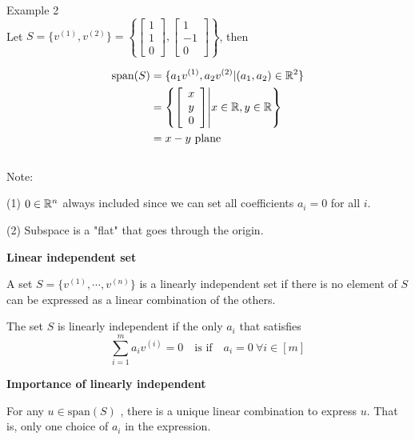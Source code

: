 Example 2\\
Let $S=\{v^{(1)}, v^{(2)}\}=\left\{\left[ 
\begin{array}{c} 
1\\
1\\
0
\end{array}
\right],           
\left[ 
\begin{array}{c} 
1\\
-1\\
0
\end{array}
\right]
\right\}$, then

\begin{align*}
\text{span}(S)&=\{a_{1}v^{(1)}, a_{2}v^{(2)}|(a_{1}, a_{2})\in \mathbb{R}^{2}\}\\
&=\left\{\left[ 
	\begin{array}{c} 
	x\\
	y\\
	0
	\end{array}
	\right] \middle|x\in\mathbb{R} , y\in\mathbb{R}\right\}\\
&=\text{$x-y$ plane}
\end{align*}\\


Note:

(1) $0\in\mathbb{R}^{n}$ always included since we can set all coefficients $a_{i}=0$ for all $i$.

(2) Subspace is a "flat" that goes through the origin.

\vspace{0.5cm}
\noindent\textbf{Linear independent set}

A set $S=\{v^{(1)},\cdots , v^{(n)}\}$ is a linearly independent set if there is no element of $S$ can be expressed as a linear combination of the others.

The set $S$ is linearly independent if the only $a_{i}$ that satisfies
$$\sum_{i=1}^{m}a_{i}v^{(i)}=0\quad \text{is if} \quad a_{i}=0 \ \forall i\in [m]$$


\vspace{0.5cm}
\textbf{Importance of linearly independent}

For any $u\in \text{span}(S)$ , there is a unique linear combination to express $u$. That is, only one choice of $a_{i}$ in the expression.

\begin{marginfigure}
	\centering
	\resizebox{7.5cm}{3cm}{}
	\caption{}
	\label{fig.2-4}
\end{marginfigure}
\begin{marginfigure}
	\centering
	\resizebox{7.5cm}{3cm}{}
	\caption{}
	\label{fig.2-4}
\end{marginfigure}


